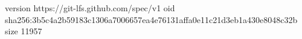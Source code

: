 version https://git-lfs.github.com/spec/v1
oid sha256:3b5c4a2b59183c1306a7006657ea4e76131affa0e11c21d3eb1a430e8048c32b
size 11957
